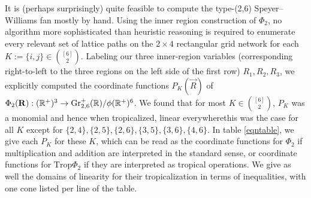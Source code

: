 \documentclass[12pt,letter]{article}
\newcommand{\gr}{\mathrm{Gr}}
\newcommand{\trop}{\mathrm{Trop}}
\begin{document}
\begin{example}
It is (perhaps surprisingly) quite feasible to compute the type-(2,6) Speyer--Williams fan mostly by hand.  Using the inner region construction of $\Phi_2$, no algorithm more sophisticated than heuristic reasoning is required to enumerate every relevant set of lattice paths on the $2\times 4$ rectangular grid network for each $K:=\{i,j\}\in {[6]\choose 2}$. Labeling our three inner-region variables (corresponding right-to-left to the three regions on the left side of the first row) $R_1,R_2,R_3$, we explicitly computed the coordinate functions $P_K(\vec{R})$ of $\Phi_2(\vec{R}):(\RR^+)^3\to \gr^+_{2,6}(\RR) /\phi(\RR^+)^6$. We found that for most $K\in {[6]\choose 2}$, $P_K$ was a monomial and hence when tropicalized, linear everywhere\textemdash this was the case for all $K$ except for $\{2,4\},\{2,5\},\{2,6\},\{3,5\},\{3,6\},\{4,6\}$. In table \ref{eqntable}, we give each $P_K$ for these $K$, which can be read as the coordinate functions for $\Phi_2$ if multiplication and addition are interpreted in the standard sense, or coordinate functions for $\trop \Phi_2$ if they are interpreted as tropical operations. We give as well the domains of linearity for their tropicalization in terms of inequalities, with one cone listed per line of the table. 


\end{example}
\end{document}
